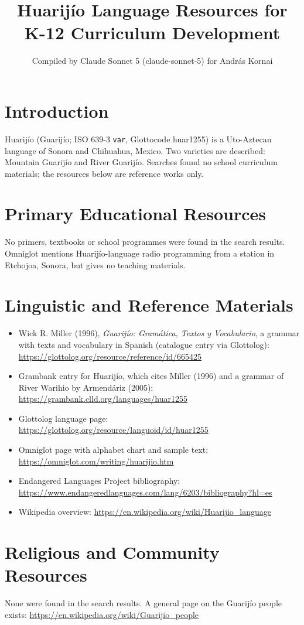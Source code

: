 \documentclass[12pt]{article}
\title{Huarij\'io Language Resources for K-12 Curriculum Development}
\author{Compiled by Claude Sonnet 5 (claude-sonnet-5) for Andr\'as Kornai}
\date{}
\begin{document}
\maketitle

\section{Introduction}
Huarij\'io (Guarij\'io; ISO 639-3 \texttt{var}, Glottocode huar1255) is a Uto-Aztecan language of Sonora and Chihuahua, Mexico. Two varieties are described: Mountain Guarij\'io and River Guarij\'io. Searches found no school curriculum materials; the resources below are reference works only.

\section{Primary Educational Resources}
No primers, textbooks or school programmes were found in the search results. Omniglot mentions Huarij\'io-language radio programming from a station in Etchojoa, Sonora, but gives no teaching materials.

\section{Linguistic and Reference Materials}
\begin{itemize}
\item Wick R. Miller (1996), \emph{Guarij\'io: Gram\'atica, Textos y Vocabulario}, a grammar with texts and vocabulary in Spanish (catalogue entry via Glottolog): \url{https://glottolog.org/resource/reference/id/665425}
\item Grambank entry for Huarij\'io, which cites Miller (1996) and a grammar of River Warihio by Armend\'ariz (2005): \url{https://grambank.clld.org/languages/huar1255}
\item Glottolog language page: \url{https://glottolog.org/resource/languoid/id/huar1255}
\item Omniglot page with alphabet chart and sample text: \url{https://omniglot.com/writing/huarijio.htm}
\item Endangered Languages Project bibliography: \url{https://www.endangeredlanguages.com/lang/6203/bibliography?hl=es}
\item Wikipedia overview: \url{https://en.wikipedia.org/wiki/Huarijio_language}
\end{itemize}

\section{Religious and Community Resources}
None were found in the search results. A general page on the Guarij\'io people exists: \url{https://en.wikipedia.org/wiki/Guarijio_people}
\end{document}
